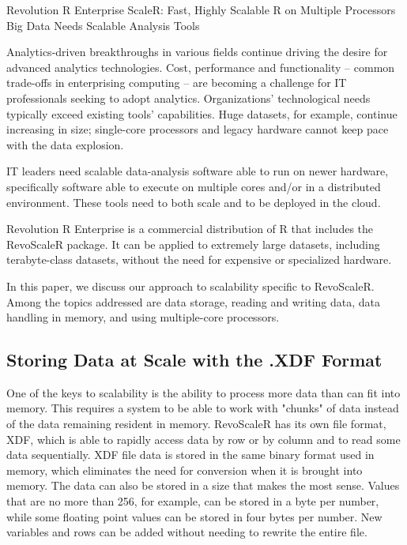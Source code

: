 Revolution R Enterprise ScaleR: Fast, Highly Scalable R on Multiple Processors
Big Data Needs Scalable Analysis Tools

Analytics-driven breakthroughs in various fields continue driving the desire for advanced analytics technologies. Cost, performance and functionality -- common trade-offs in enterprising computing -- are becoming a challenge for IT professionals seeking to adopt analytics. Organizations' technological needs typically exceed existing tools' capabilities. Huge datasets, for example, continue increasing in size; single-core processors and legacy hardware cannot keep pace with the data explosion.

IT leaders need scalable data-analysis software able to run on newer hardware, specifically software able to execute on multiple cores and/or in a distributed environment. These tools need to both scale and to be deployed in the cloud.

Revolution R Enterprise is a commercial distribution of R that includes the RevoScaleR package. It can be applied to extremely large datasets, including terabyte-class datasets, without the need for expensive or specialized hardware.

In this paper, we discuss our approach to scalability specific to RevoScaleR. Among the topics addressed are data storage, reading and writing data, data handling in memory, and using multiple-core processors.

\subsection*{Storing Data at Scale with the .XDF Format}

One of the keys to scalability is the ability to process more data than can fit into memory. This requires a system to be able to work with "chunks" of data instead of the data remaining resident in memory. RevoScaleR has its own file format, XDF, which is able to rapidly access data by row or by column and to read some data sequentially. XDF file data is stored in the same binary format used in memory, which eliminates the need for conversion when it is brought into memory. The data can also be stored in a size that makes the most sense. Values that are no more than 256, for example, can be stored in a byte per number, while some floating point values can be stored in four bytes per number. New variables and rows can be added without needing to rewrite the entire file.

